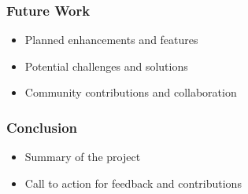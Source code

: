 \documentclass{beamer}
\begin{document}
\begin{frame}
    \frametitle{Future Work}
    \begin{itemize}
        \item Planned enhancements and features
        \item Potential challenges and solutions
        \item Community contributions and collaboration
    \end{itemize}
\end{frame}

\begin{frame}
    \frametitle{Conclusion}
    \begin{itemize}
        \item Summary of the project
        \item Call to action for feedback and contributions
    \end{itemize}
\end{frame}
\end{document}
